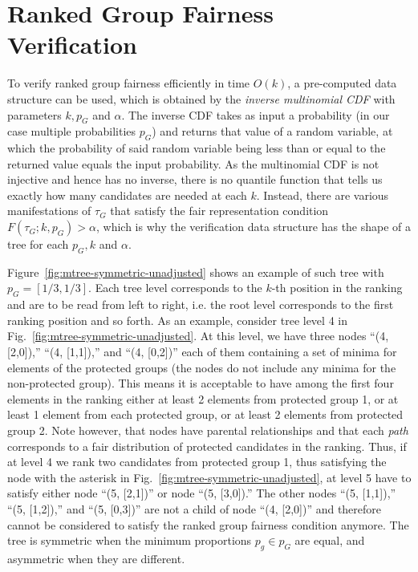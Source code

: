 
\section{Ranked Group Fairness Verification}
\label{sec:fairness-verification}
To verify ranked group fairness efficiently in time $O(k)$, a pre-computed data structure can be used, which is obtained by the \emph{inverse multinomial CDF} with parameters $k, p_G$ and $ \alpha $.
%
The inverse CDF takes as input a probability (in our case multiple probabilities $p_G$) and returns that value of a random variable, at which the probability of said random variable being less than or equal to the returned value equals the input probability.
%
As the multinomial CDF is not injective and hence has no inverse, there is no quantile function that tells us exactly how many candidates are needed at each $ k $.
%
Instead, there are various manifestations of $ \tau_G $ that satisfy the fair representation condition $F(\tau_G;k,p_G) > \alpha$, which is why the verification data structure has the shape of a tree for each $ p_G, k $ and $ \alpha $.
%

Figure~\ref{fig:mtree-symmetric-unadjusted} shows an example of such tree with $p_G = [1/3, 1/3]$.
%
Each tree level corresponds to the $k$-th position in the ranking and are to be read from left to right, i.e. the root level corresponds to the first ranking position and so forth.
%
As an example, consider tree level 4 in Fig.~\ref{fig:mtree-symmetric-unadjusted}.
%
At this level, we have three nodes ``(4, [2,0]),'' ``(4, [1,1]),'' and ``(4, [0,2])'' each of them containing a set of minima for elements of the protected groups (the nodes do not include any minima for the non-protected group).
%
This means it is acceptable to have among the first four elements in the ranking either at least 2 elements from protected group 1, or at least 1 element from each protected group, or at least 2 elements from protected group 2.
%
Note however, that nodes have parental relationships and that each \emph{path} corresponds to a fair distribution of protected candidates in the ranking.
%
Thus, if at level 4 we rank two candidates from protected group 1, thus satisfying the node with the asterisk in Fig.~\ref{fig:mtree-symmetric-unadjusted}, at level 5 have to satisfy either node ``(5, [2,1])'' or node ``(5, [3,0]).''
%
The other nodes ``(5, [1,1]),'' ``(5, [1,2]),'' and ``(5, [0,3])'' are not a child of node ``(4, [2,0])'' and therefore cannot be considered to satisfy the ranked group fairness condition anymore.
%
The tree is symmetric when the minimum proportions $p_g \in p_G$ are equal, and asymmetric when they are different.
%
%

